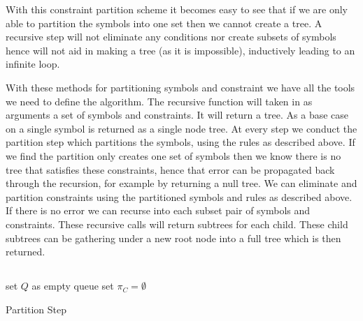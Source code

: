 With this constraint partition scheme it becomes easy to see that if we are only able to partition the symbols into one set then we cannot create a tree.
A recursive step will not eliminate any conditions nor create subsets of symbols hence will not aid in making a tree (as it is impossible), inductively leading to an infinite loop.

With these methods for partitioning symbols and constraint we have all the tools we need to define the  algorithm.
The recursive  function will taken in as arguments a set of symbols and constraints.
It will return a tree. As a base case  on a single symbol is returned as a single node tree.
At every step we conduct the partition step which partitions the symbols, using the rules as described above.
If we find the partition only creates one set of symbols then we know there is no tree that satisfies these constraints, hence that error can be propagated back through the recursion, for example by returning a null tree.
We can eliminate and partition constraints using the partitioned symbols and rules as described above.
If there is no error we can recurse into each subset pair of symbols and constraints.
These recursive calls will return subtrees for each child. These child subtrees can be gathering under a new root node into a full tree which is then returned.    

\subsection{}
\begin{algorithm}[H]
    \SetAlgoLined
     set $Q$ as empty queue\;
     set $\pi_C = \emptyset$\;
     
    
     \caption{Partition Step}
    \end{algorithm}

